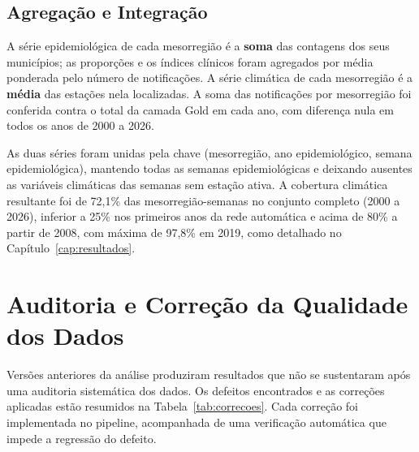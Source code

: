 \subsection{Agregação e Integração}

A série epidemiológica de cada mesorregião é a \textbf{soma} das contagens dos seus municípios; as proporções e os índices clínicos foram agregados por média ponderada pelo número de notificações. A série climática de cada mesorregião é a \textbf{média} das estações nela localizadas. A soma das notificações por mesorregião foi conferida contra o total da camada Gold em cada ano, com diferença nula em todos os anos de 2000 a 2026.

As duas séries foram unidas pela chave (mesorregião, ano epidemiológico, semana epidemiológica), mantendo todas as semanas epidemiológicas e deixando ausentes as variáveis climáticas das semanas sem estação ativa. A cobertura climática resultante foi de 72,1\% das mesorregião-semanas no conjunto completo (2000 a 2026), inferior a 25\% nos primeiros anos da rede automática e acima de 80\% a partir de 2008, com máxima de 97,8\% em 2019, como detalhado no Capítulo~\ref{cap:resultados}.

\section{Auditoria e Correção da Qualidade dos Dados}
\label{sec:correcoes}

Versões anteriores da análise produziram resultados que não se sustentaram após uma auditoria sistemática dos dados. Os defeitos encontrados e as correções aplicadas estão resumidos na Tabela~\ref{tab:correcoes}. Cada correção foi implementada no pipeline, acompanhada de uma verificação automática que impede a regressão do defeito.

